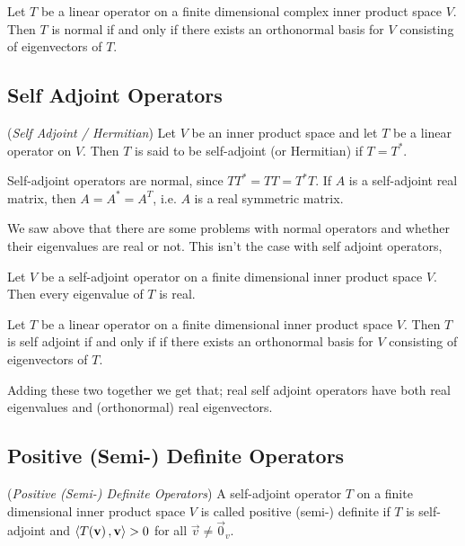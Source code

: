 \documentclass{article}
\begin{document}
\begin{nthm}
  Let $T$ be a linear operator on a finite dimensional complex inner product space $V$. Then $T$ is normal if and only if there exists an orthonormal basis for $V$ consisting of eigenvectors of $T$.
\end{nthm}

\subsection{Self Adjoint Operators}

\begin{ndefi}{(\textit{Self Adjoint / Hermitian})}
  Let $V$ be an inner product space and let $T$ be a linear operator on $V$. Then $T$ is said to be self-adjoint (or Hermitian) if $T = T^*$.
\end{ndefi}

\begin{remark}
  Self-adjoint operators are normal, since $TT^* = TT = T^*T$. If $A$ is a self-adjoint real matrix, then $A = A^* = A^T$, i.e. $A$ is a real symmetric matrix.
\end{remark}

We saw above that there are some problems with normal operators and whether their eigenvalues are real or not. This isn't the case with self adjoint operators,

\begin{nlemma}
  Let $V$ be a self-adjoint operator on a finite dimensional inner product space $V$. Then every eigenvalue of $T$ is real.
\end{nlemma}

\begin{nthm}
  Let $T$ be a linear operator on a finite dimensional inner product space $V$. Then $T$ is self adjoint if and only if if there exists an orthonormal basis for $V$ consisting of eigenvectors of $T$.
\end{nthm}

\noindent
Adding these two together we get that; real self adjoint operators have both real eigenvalues and (orthonormal) real eigenvectors.

\subsection{Positive (Semi-) Definite Operators}

\begin{ndefi}{(\textit{Positive (Semi-) Definite Operators})}
  A self-adjoint operator $T$ on a finite dimensional inner product space $V$ is called positive (semi-) definite if $T$ is self-adjoint and $\left\langle T(\boldsymbol{\mathbf{v}})\,, \boldsymbol{\mathbf{v}} \right\rangle > 0$ for all $\vec v \ne \vec 0_v$.
\end{ndefi}
\end{document}
